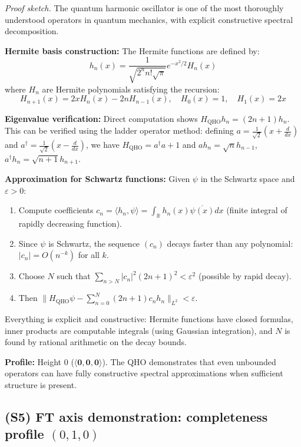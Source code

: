 \documentclass[11pt]{article}
\newcommand{\hzero}{\mathbf{0}}
\newcommand{\allzero}{\langle \hzero,\hzero,\hzero\rangle}
\newcommand{\leanok}{\text{\tiny [✓ Lean]}}
\theoremstyle{plain}
\theoremstyle{definition}
\theoremstyle{remark}
\newenvironment{prfsketch}{\noindent\textit{Proof sketch.} }{}
\newcommand{\R}{\mathbb{R}}
\begin{document}
\begin{prfsketch}
The quantum harmonic oscillator is one of the most thoroughly understood operators in quantum mechanics, with explicit constructive spectral decomposition.

\textbf{Hermite basis construction:}
The Hermite functions are defined by:
$$h_n(x) = \frac{1}{\sqrt{2^n n! \sqrt{\pi}}} e^{-x^2/2} H_n(x)$$
where $H_n$ are Hermite polynomials satisfying the recursion:
$$H_{n+1}(x) = 2x H_n(x) - 2n H_{n-1}(x), \quad H_0(x) = 1, \quad H_1(x) = 2x$$

\textbf{Eigenvalue verification:}
Direct computation shows $H_{\mathrm{QHO}} h_n = (2n+1) h_n$. This can be verified using the ladder operator method:
defining $a = \frac{1}{\sqrt{2}}(x + \frac{d}{dx})$ and $a^\dagger = \frac{1}{\sqrt{2}}(x - \frac{d}{dx})$,
we have $H_{\mathrm{QHO}} = a^\dagger a + 1$ and $a h_n = \sqrt{n} h_{n-1}$, $a^\dagger h_n = \sqrt{n+1} h_{n+1}$.

\textbf{Approximation for Schwartz functions:}
Given $\psi$ in the Schwartz space and $\varepsilon > 0$:
\begin{enumerate}
\item Compute coefficients $c_n = \langle h_n, \psi \rangle = \int_\R h_n(x) \overline{\psi(x)} dx$ (finite integral of rapidly decreasing function).
\item Since $\psi$ is Schwartz, the sequence $(c_n)$ decays faster than any polynomial: $|c_n| = O(n^{-k})$ for all $k$.
\item Choose $N$ such that $\sum_{n>N} |c_n|^2(2n+1)^2 < \varepsilon^2$ (possible by rapid decay).
\item Then $\|H_{\mathrm{QHO}}\psi - \sum_{n=0}^N (2n+1) c_n h_n\|_{L^2} < \varepsilon$.
\end{enumerate}

Everything is explicit and constructive: Hermite functions have closed formulas, inner products are computable integrals (using Gaussian integration), and $N$ is found by rational arithmetic on the decay bounds.
\end{prfsketch}

\noindent\textbf{Profile:} Height 0 ($\allzero$). The QHO demonstrates that even unbounded operators can have fully constructive spectral approximations when sufficient structure is present.

\subsection{(S5) FT axis demonstration: completeness profile $(0,1,0)$} \leanok
\end{document}
